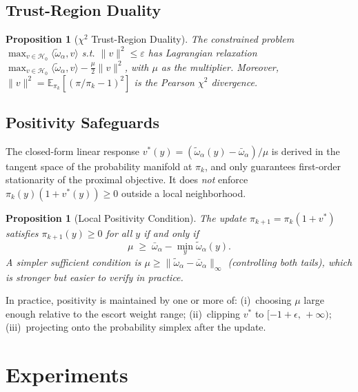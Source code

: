 \documentclass[11pt]{article}
\newtheorem{proposition}[theorem]{Proposition}
\theoremstyle{definition}
\theoremstyle{remark}
\newcommand{\E}{\mathbb{E}}
\newcommand{\pik}{\pi_k}
\begin{document}
\subsection{Trust-Region Duality}

\begin{proposition}[$\chi^2$ Trust-Region Duality]
\label{prop:chi2_duality}
The constrained problem
$\max_{v\in\mathcal H_0} \langle \tilde{\omega}_\alpha, v\rangle$ s.t. $\|v\|^2 \le \varepsilon$
has Lagrangian relaxation $\max_{v\in\mathcal H_0} \langle \tilde{\omega}_\alpha, v\rangle - \frac{\mu}{2}\|v\|^2$,
with $\mu$ as the multiplier.
Moreover, $\|v\|^2 = \E_{\pik}[(\pi/\pik-1)^2]$ is the Pearson $\chi^2$ divergence.
\end{proposition}

\subsection{Positivity Safeguards}
\label{sec:positivity}

The closed-form linear response $v^*(y)=(\tilde{\omega}_\alpha(y)-\bar{\omega}_\alpha)/\mu$ is derived in the tangent space of the probability manifold at $\pik$, and only guarantees first-order stationarity of the proximal objective. It does \emph{not} enforce $\pik(y)(1+v^*(y))\ge 0$ outside a local neighborhood.

\begin{proposition}[Local Positivity Condition]
\label{prop:positivity}
The update $\pi_{k+1}=\pik(1+v^*)$ satisfies $\pi_{k+1}(y) \ge 0$ for all $y$ if and only if
\begin{equation}
\mu \;\ge\; \bar{\omega}_\alpha - \min_y \tilde{\omega}_\alpha(y).
\end{equation}
A simpler sufficient condition is $\mu \ge \|\tilde{\omega}_\alpha - \bar{\omega}_\alpha\|_\infty$ (controlling both tails), which is stronger but easier to verify in practice.
\end{proposition}

In practice, positivity is maintained by one or more of: (i)~choosing $\mu$ large enough relative to the escort weight range; (ii)~clipping $v^*$ to $[-1+\epsilon,\,+\infty)$; (iii)~projecting onto the probability simplex after the update.

\section{Experiments}
\label{sec:experiments}
\end{document}
